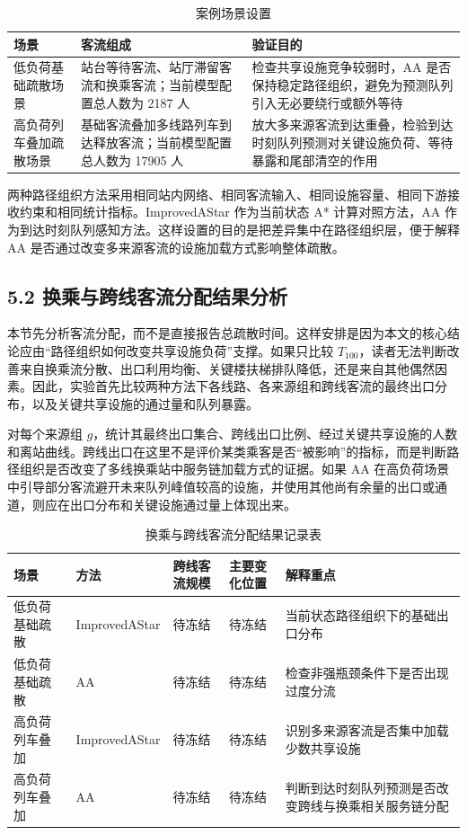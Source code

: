 \documentclass[UTF8,a4paper,12pt]{ctexart}
\begin{document}
\begin{table}[htbp]
\centering
\caption{案例场景设置}
\small
\begin{tabular}{p{}p{}p{}}
\toprule
场景 & 客流组成 & 验证目的 \\
\midrule
低负荷基础疏散场景 & 站台等待客流、站厅滞留客流和换乘客流；当前模型配置总人数为 2187 人 & 检查共享设施竞争较弱时，AA 是否保持稳定路径组织，避免为预测队列引入无必要绕行或额外等待 \\
高负荷列车叠加疏散场景 & 基础客流叠加多线路列车到达释放客流；当前模型配置总人数为 17905 人 & 放大多来源客流到达重叠，检验到达时刻队列预测对关键设施负荷、等待暴露和尾部清空的作用 \\
\bottomrule
\end{tabular}
\end{table}

两种路径组织方法采用相同站内网络、相同客流输入、相同设施容量、相同下游接收约束和相同统计指标。ImprovedAStar 作为当前状态 A* 计算对照方法，AA 作为到达时刻队列感知方法。这样设置的目的是把差异集中在路径组织层，便于解释 AA 是否通过改变多来源客流的设施加载方式影响整体疏散。

\subsection{5.2 换乘与跨线客流分配结果分析}

本节先分析客流分配，而不是直接报告总疏散时间。这样安排是因为本文的核心结论应由“路径组织如何改变共享设施负荷”支撑。如果只比较 \(T_{100}\)，读者无法判断改善来自换乘流分散、出口利用均衡、关键楼扶梯排队降低，还是来自其他偶然因素。因此，实验首先比较两种方法下各线路、各来源组和跨线客流的最终出口分布，以及关键共享设施的通过量和队列暴露。

对每个来源组 \(g\)，统计其最终出口集合、跨线出口比例、经过关键共享设施的人数和离站曲线。跨线出口在这里不是评价某类乘客是否“被影响”的指标，而是判断路径组织是否改变了多线换乘站中服务链加载方式的证据。如果 AA 在高负荷场景中引导部分客流避开未来队列峰值较高的设施，并使用其他尚有余量的出口或通道，则应在出口分布和关键设施通过量上体现出来。

\begin{table}[htbp]
\centering
\caption{换乘与跨线客流分配结果记录表}
\small
\begin{tabular}{p{}p{}p{}p{}p{}}
\toprule
场景 & 方法 & 跨线客流规模 & 主要变化位置 & 解释重点 \\
\midrule
低负荷基础疏散 & ImprovedAStar & 待冻结 & 待冻结 & 当前状态路径组织下的基础出口分布 \\
低负荷基础疏散 & AA & 待冻结 & 待冻结 & 检查非强瓶颈条件下是否出现过度分流 \\
高负荷列车叠加 & ImprovedAStar & 待冻结 & 待冻结 & 识别多来源客流是否集中加载少数共享设施 \\
高负荷列车叠加 & AA & 待冻结 & 待冻结 & 判断到达时刻队列预测是否改变跨线与换乘相关服务链分配 \\
\bottomrule
\end{tabular}
\end{table}
\end{document}
